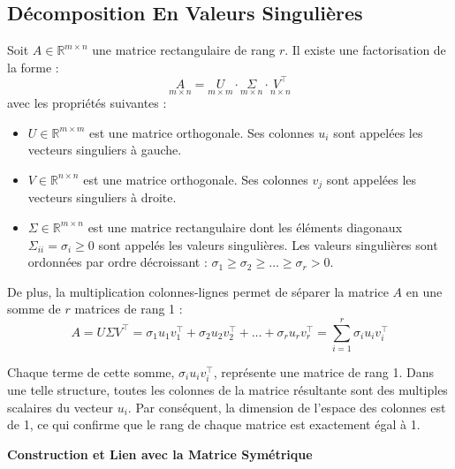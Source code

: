\documentclass[12pt]{report}
\begin{document}
\subsection*{Décomposition En Valeurs Singulières}
\noindent Soit $A \in \mathbb{R}^{m \times n}$ une matrice rectangulaire de rang $r$. Il existe une factorisation de la forme :
\[
    \underset{m \times n}{A} = \underset{m \times m}{U} \cdot \underset{m \times n}{\Sigma} \cdot \underset{n \times n}{V^\top}
\]
avec les propriétés suivantes :
\begin{itemize}
    \item $U \in \mathbb{R}^{m \times m}$ est une matrice orthogonale. Ses colonnes $u_i$ sont appelées les {vecteurs singuliers à gauche}.
    \item $V \in \mathbb{R}^{n \times n}$ est une matrice orthogonale. Ses colonnes $v_j$ sont appelées les {vecteurs singuliers à droite}.
    \item $\Sigma \in \mathbb{R}^{m \times n}$ est une matrice rectangulaire dont les éléments diagonaux $\Sigma_{ii} = \sigma_i \ge 0$ sont appelés les {valeurs singulières}. Les valeurs singulières sont ordonnées par ordre décroissant : $\sigma_1 \ge \sigma_2 \ge \dots \ge \sigma_r > 0$.
\end{itemize}

\noindent De plus, la multiplication colonnes-lignes permet de séparer la matrice $A$ en une somme de $r$ matrices de rang 1 :
$$A = U \Sigma V^{\top} = \sigma_1 u_1 v_1^{\top} + \sigma_2 u_2 v_2^{\top} + \dots + \sigma_r u_r v_r^{\top} = \sum_{i=1}^{r} \sigma_i u_i v_i^{\top}$$

\noindent Chaque terme de cette somme, $\sigma_i u_i v_i^{\top}$, représente une matrice de rang 1. Dans une telle structure, toutes les colonnes de la matrice résultante sont des multiples scalaires du vecteur $u_i$. Par conséquent, la dimension de l'espace des colonnes est de 1, ce qui confirme que le rang de chaque matrice est exactement égal à 1.
\[
\]


\noindent \textbf {Construction et Lien avec la Matrice Symétrique}
\end{document}
